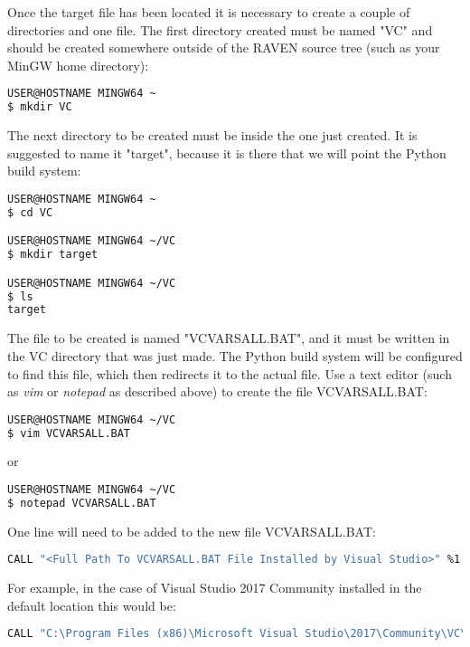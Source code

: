 \begin{enumerate}
		\medskip
		Once the target file has been located it is necessary to create a couple of directories 
		and one file. The first directory created must be named "VC" and should be created 
		somewhere outside of the RAVEN source tree (such as your MinGW home directory):

\begin{lstlisting}[language=bash]
USER@HOSTNAME MINGW64 ~
$ mkdir VC
\end{lstlisting}

		The next directory to be created must be inside the one just created. It is suggested 
		to name it "target", because it is there that we will point the Python build system:

\begin{lstlisting}[language=bash]
USER@HOSTNAME MINGW64 ~
$ cd VC

USER@HOSTNAME MINGW64 ~/VC
$ mkdir target

USER@HOSTNAME MINGW64 ~/VC
$ ls
target

\end{lstlisting}

		The file to be created is named "VCVARSALL.BAT", and it must be written in the VC 
		directory that was just made. The Python build system will be configured to find this 
		file, which then redirects it to the actual file. Use a text editor (such as 
		{\it vim} or {\it notepad} as described above) to create the file VCVARSALL.BAT:

\begin{lstlisting}[language=bash]
USER@HOSTNAME MINGW64 ~/VC
$ vim VCVARSALL.BAT
\end{lstlisting}

		or

\begin{lstlisting}[language=bash]
USER@HOSTNAME MINGW64 ~/VC
$ notepad VCVARSALL.BAT
\end{lstlisting}

		One line will need to be added to the new file VCVARSALL.BAT:

\begin{lstlisting}[language=bash, basicstyle=\tiny]
CALL "<Full Path To VCVARSALL.BAT File Installed by Visual Studio>" %1 %2 %3 %4 %5
\end{lstlisting}

		For example, in the case of Visual Studio 2017 Community installed in the default 
		location this would be:

\begin{lstlisting}[language=bash, basicstyle=\tiny]
CALL "C:\Program Files (x86)\Microsoft Visual Studio\2017\Community\VC\Auxiliary\Build\VCVARSALL.BAT" %1 %2 %3 %4 %5
\end{lstlisting}


\end{enumerate}

